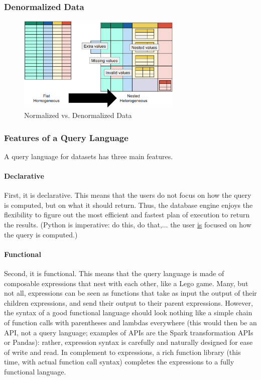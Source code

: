 \subsubsection{Denormalized Data}

\begin{figure}[h]
    \centering
    \includegraphics[width=0.7\textwidth]{Figures/DenormalizedData.png}
    \caption{Normalized vs. Denormalized Data}
\end{figure}

\subsubsection{Features of a Query Language}

A query language for datasets has three main features.

\paragraph{Declarative}
First, it is declarative. This means that the users do not focus on how the query is computed, but on what it should return. Thus, the database engine enjoys the flexibility to figure out the most efficient and fastest plan of execution to return the results.
(Python is imperative: do this, do that,... the user \underline{is} focused on how the query is computed.)

\paragraph{Functional}
Second, it is functional. This means that the query language is made of composable expressions that nest with each other, like a Lego game. Many, but not all, expressions can be seen as functions that take as input the output of their children expressions, and send their output to their parent expressions. However, the syntax of a good functional language should look nothing like a simple chain of function calls with parentheses and lambdas everywhere (this would then be an API, not a query language; examples of APIs are the Spark transformation APIs or Pandas): rather, expression syntax is carefully and naturally designed for ease of write and read. In complement to expressions, a rich function library (this time, with actual function call syntax) completes the expressions to a fully functional language.

